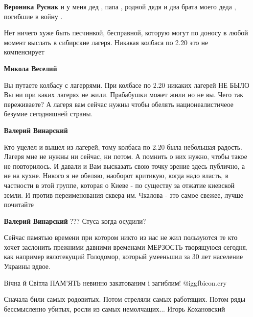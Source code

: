 \begin{itemize}
\begin{itemize}
\begin{itemize}
\textbf{Вероника Руснак} и у меня дед , папа , родной дядя и два брата моего деда , погибшие в войну .
\end{itemize} %

\end{itemize} %


Нет ничего хуже быть песчинкой, бесправной, которую могут по доносу в любой
момент выслать в сибирские лагеря. Никакая колбаса по 2.20 это не компенсирует

\begin{itemize} %
\textbf{Микола Веселий} 

Вы путаете колбасу с лагеррями. При колбасе по 2.20 никаких лагерей НЕ БЫЛО Вы
ни при каких лагерях не жили. Прабабушки может жили но не вы. Чего так
переживаете? А лагеря вам сейчас нужны чтобы обелять национеалистичеое безумие
сегодняшней страны.

\begin{itemize} %
\textbf{Валерий Винарский} 

Кто уцелел и вышел из лагерей, тому колбаса по 2.20 была небольшая радость.
Лагеря мне не нужны ни сейчас, ни потом. А помнить о них нужно, чтобы такое не
повторилось. И давали и Вам высказать свою точку зрение здесь публично, а не на
кухне. Никого я не обеляю, наоборот критикую, когда надо власть, в частности в
этой группе, которая о Киеве - по существу за отжатие киевской земли. И против
переименования сквера им. Чкалова - это самое свежее, лучше почитайте

\textbf{Валерий Винарский} ??? Стуса когда осудили?


Сейчас памятью времени при котором никто из нас не жил пользуются те кто хочет
заслонить прежними давними временами МЕРЗОСТЬ творящуюся сегодня, как например
вялотекущий Голодомор, который умееньшил за 30 лет население Украины вдвое.

\end{itemize} %

\end{itemize} %

Вічна й Світла ПАМ'ЯТЬ невинно закатованим і загиблим! @igg{fbicon.cry} 

Сначала били самых родовитых.
Потом стреляли самых работящих.
Потом ряды бессмысленно убитых, росли из самых немолчащих...
Игорь Кохановский


\end{itemize}
